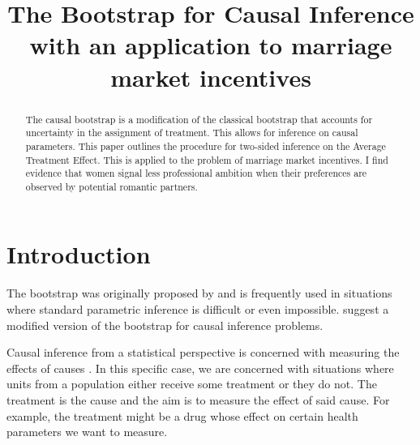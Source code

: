 \documentclass[aodsor,preprint]{imsart}
\numberwithin{equation}{section}
\theoremstyle{plain}
\begin{document}
\begin{frontmatter}
\title{The Bootstrap for Causal Inference with an application to marriage market incentives}

\begin{aug}
\author{ }





\end{aug}

\begin{abstract}
The causal bootstrap is a modification of the classical bootstrap that accounts for uncertainty in the assignment of treatment. This allows for inference on causal parameters. This paper outlines the procedure for two-sided inference on the Average Treatment Effect.
This is applied to the problem of marriage market incentives. I find evidence that women signal less professional ambition when their preferences are observed by potential romantic partners.
\end{abstract}

\begin{keyword}[class=MSC]
\end{keyword}

\begin{keyword}
\end{keyword}

\end{frontmatter}

\section{Introduction}

The bootstrap was originally proposed by \cite{Efron_1982} and is frequently used in situations where standard parametric inference is difficult or even impossible. \cite{Imbens_2021} suggest a modified version of the bootstrap for causal inference problems.

Causal inference from a statistical perspective is concerned with measuring the effects of causes \citep{Holland_1986}. In this specific case, we are concerned with situations where units from a population either receive some treatment or they do not. The treatment is the cause and the aim is to measure the effect of said cause. For example, the treatment might be a drug whose effect on certain health parameters we want to measure. 
\end{document}
